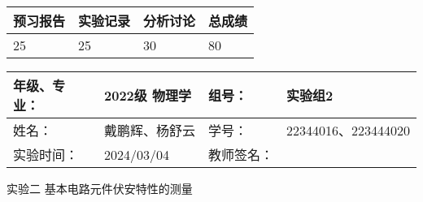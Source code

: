 \documentclass[dvipsnames, svgnames,a4paper,11pt]{article}
\begin{document}
	
	
	
	
	\begin{table}
		\renewcommand\arraystretch{1.7}
		\begin{tabularx}{\textwidth}{
				|X|X|X|X
				|X|X|X|X|}
			\hline
			\multicolumn{2}{|c|}{预习报告}&\multicolumn{2}{|c|}{实验记录}&\multicolumn{2}{|c|}{分析讨论}&\multicolumn{2}{|c|}{总成绩}\\
			\hline
			\LARGE 25 & & \LARGE25 & & \LARGE30 & & \LARGE80 & \\
			\hline
		\end{tabularx}
	\end{table}
	
	\begin{table}
		\renewcommand\arraystretch{1.7}
		\begin{tabularx}{\textwidth}{|X|X|X|X|}
			\hline
			年级、专业： & 2022级 物理学 &组号： & 实验组2\\
			\hline
			姓名： & 戴鹏辉、杨舒云  & 学号： & 22344016、223444020\\
			\hline
			实验时间： & 2024/03/04 & 教师签名： & \\
			\hline
		\end{tabularx}
	\end{table}
	
	\begin{center}
		\LARGE 实验二 \quad 基本电路元件伏安特性的测量
	\end{center}
	
	
\end{document}
